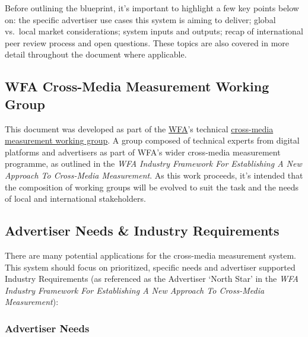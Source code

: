 \documentclass[]{article}
\begin{document}
Before outlining the blueprint, it's important to highlight a few key points below on: the specific advertiser use cases this system is aiming to deliver; global vs.~local market considerations; system inputs and outputs; recap of international peer review process and open questions. These topics are also covered in more detail throughout the document where applicable.


\subsection{WFA Cross-Media Measurement Working Group}

This document was developed as part of the \href{https://wfanet.org/}{WFA}'s technical \href{https://wfanet.org/knowledge/item/2019/10/04/Global-advertisers-launch-drive-to-establish-cross-media-measurement-principles}{cross-media measurement working group}. A group composed of technical experts from digital platforms and advertisers as part of WFA's wider cross-media measurement programme, as outlined in the \emph{WFA Industry Framework For Establishing A New Approach To Cross-Media Measurement}. As this work proceeds, it's intended that the composition of working groups will be evolved to suit the task and the needs of local and international stakeholders.


\subsection{Advertiser Needs \& Industry Requirements}

There are many potential applications for the cross-media measurement
system. This system should focus on prioritized, specific needs and
advertiser supported Industry Requirements (as referenced as the
Advertiser `North Star' in the \emph{WFA Industry Framework For
Establishing A New Approach To Cross-Media Measurement}):


\subsubsection{Advertiser Needs}

\renewcommand{\labelitemi}{$\bullet$}
\renewcommand\labelitemii{$\circ$}
\renewcommand\labelitemiii{$\square$}
\end{document}
